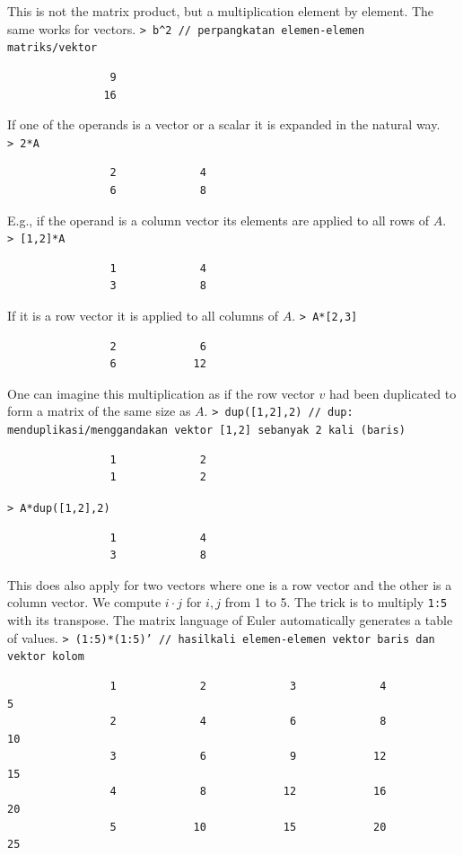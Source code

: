 \documentclass[11pt, a4paper]{article}
\newcommand{\emtcmd}[1]{\noindent\texttt{\textcolor{emtcommand}{>}\ #1}\par\smallskip}
\begin{document}
This is not the matrix product, but a multiplication element by element. The same works for vectors.
\emtcmd{b\^{}2 \textcolor{emtcomment}{// perpangkatan elemen-elemen matriks/vektor}}
\begin{verbatim}
                9
               16
\end{verbatim}

If one of the operands is a vector or a scalar it is expanded in the natural way.
\emtcmd{2*A}
\begin{verbatim}
                2             4
                6             8
\end{verbatim}

E.g., if the operand is a column vector its elements are applied to all rows of $A$.
\emtcmd{[1,2]*A}
\begin{verbatim}
                1             4
                3             8
\end{verbatim}

If it is a row vector it is applied to all columns of $A$.
\emtcmd{A*[2,3]}
\begin{verbatim}
                2             6
                6            12
\end{verbatim}

One can imagine this multiplication as if the row vector $v$ had been duplicated to form a matrix of the same size as $A$.
\emtcmd{dup([1,2],2) \textcolor{emtcomment}{// dup: menduplikasi/menggandakan vektor [1,2] sebanyak 2 kali (baris)}}
\begin{verbatim}
                1             2
                1             2
\end{verbatim}
\emtcmd{A*dup([1,2],2)}
\begin{verbatim}
                1             4
                3             8
\end{verbatim}

This does also apply for two vectors where one is a row vector and the other is a column vector. We compute $i \cdot j$ for $i,j$ from 1 to 5. The trick is to multiply \texttt{1:5} with its transpose. The matrix language of Euler automatically generates a table of values.
\emtcmd{(1:5)*(1:5)' \textcolor{emtcomment}{// hasilkali elemen-elemen vektor baris dan vektor kolom}}
\begin{verbatim}
                1             2             3             4             5
                2             4             6             8            10
                3             6             9            12            15
                4             8            12            16            20
                5            10            15            20            25
\end{verbatim}
\end{document}

